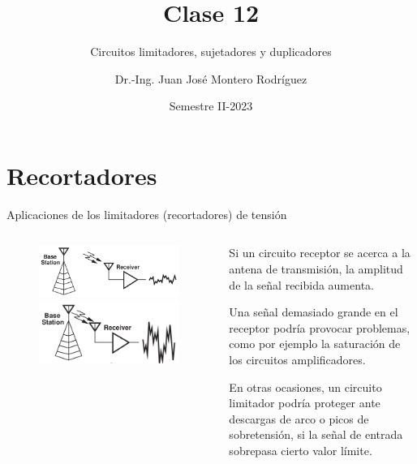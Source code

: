 \documentclass[t,aspectratio=169]{beamer}
\title{Clase 12}
\subtitle{Circuitos limitadores, sujetadores y duplicadores}
\author{Dr.-Ing. Juan José Montero Rodríguez}
\institute{Escuela de Ingeniería Electrónica}
\date{Semestre II-2023}
\begin{document}
\begin{frame}{}
\maketitle
\end{frame}

\section{Recortadores}

\begin{frame}{Aplicaciones de los limitadores (recortadores) de tensión}

\begin{columns}
\begin{column}{0.5\textwidth}

\begin{figure}
    \centering
    \includegraphics[width=\textwidth]{figures/aplicaciones_limitadores_1.png}
    \includegraphics[width=\textwidth]{figures/aplicaciones_limitadores_2.png}
\end{figure}

\end{column}
\begin{column}{0.5\textwidth}

Si un circuito receptor se acerca a la antena de transmisión, la amplitud de la señal recibida aumenta.

\vspace{5mm}Una señal demasiado grande en el receptor podría provocar problemas, como por ejemplo la saturación de los circuitos amplificadores.

\vspace{5mm}En otras ocasiones, un circuito limitador podría proteger ante descargas de arco o picos de sobretensión, si la señal de entrada sobrepasa cierto valor límite.

\end{column}
\end{columns}

\end{frame}
\end{document}
